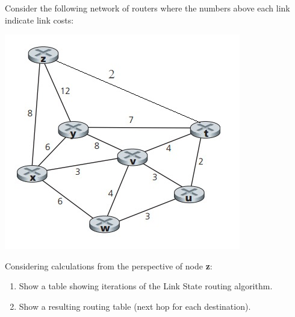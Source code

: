 \documentclass{report}
\begin{document}
\mktitle


\begin{problem}

Consider the following network of routers where the numbers above each link indicate link costs:
\begin{center}
\includegraphics[scale = 0.7]{hw7-topo.jpg}
\end{center}

Considering calculations from the perspective of node \textbf{z}:

\begin{enumerate}
\item Show a table showing iterations of the Link State routing algorithm.
\item Show a resulting routing table (next hop for each destination).
\end{enumerate}


\end{problem}
\end{document}
